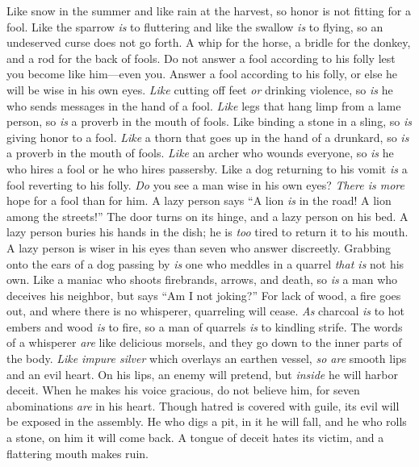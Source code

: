 \begin{biblechapter} %
\verse Like snow in the summer and like rain at the harvest, 
so honor is not fitting for a fool.
\verse Like the sparrow \textit{is} to fluttering and like the swallow \textit{is} to flying, 
so an undeserved curse does not go forth.
\verse A whip for the horse, a bridle for the donkey, 
and a rod for the back of fools.
\verse Do not answer a fool according to his folly 
lest you become like him—even you.
\verse Answer a fool according to his folly, 
or else he will be wise in his own eyes.
\verse \textit{Like} cutting off feet \textit{or} drinking violence, 
so \textit{is} he who sends messages in the hand of a fool.
\verse \textit{Like} legs that hang limp from a lame person, 
so \textit{is} a proverb in the mouth of fools.
\verse Like binding a stone in a sling, 
so \textit{is} giving honor to a fool.
\verse \textit{Like} a thorn that goes up in the hand of a drunkard, 
so \textit{is} a proverb in the mouth of fools.
\verse \textit{Like} an archer who wounds everyone, 
so \textit{is} he who hires a fool or he who hires passersby.
\verse Like a dog returning to his vomit 
\textit{is} a fool reverting to his folly.
\verse \textit{Do} you see a man wise in his own eyes? 
\textit{There is more} hope for a fool than for him.
\verse A lazy person says “A lion \textit{is} in the road! 
A lion among the streets!”
\verse The door turns on its hinge, 
and a lazy person on his bed.
\verse A lazy person buries his hands in the dish; 
he is \textit{too} tired to return it to his mouth.
\verse A lazy person is wiser in his eyes 
than seven who answer discreetly.
\verse Grabbing onto the ears of a dog 
passing by \textit{is} one who meddles in a quarrel \textit{that is} not his own.
\verse Like a maniac who shoots 
firebrands, arrows, and death,
\verse so \textit{is} a man who deceives his neighbor, 
but says “Am I not joking?”
\verse For lack of wood, a fire goes out, 
and where there is no whisperer, quarreling will cease.
\verse \textit{As} charcoal \textit{is} to hot embers and wood \textit{is} to fire, 
so a man of quarrels \textit{is} to kindling strife.
\verse The words of a whisperer \textit{are} like delicious morsels, 
and they go down to the inner parts of the body.
\verse \textit{Like} \textit{impure silver} which overlays an earthen vessel, 
\textit{so are} smooth lips and an evil heart.
\verse On his lips, an enemy will pretend, 
but \textit{inside} he will harbor deceit.
\verse When he makes his voice gracious, do not believe him, 
for seven abominations \textit{are} in his heart.
\verse Though hatred is covered with guile, 
its evil will be exposed in the assembly.
\verse He who digs a pit, in it he will fall, 
and he who rolls a stone, on him it will come back.
\verse A tongue of deceit hates its victim, 
and a flattering mouth makes ruin.
\end{biblechapter}

